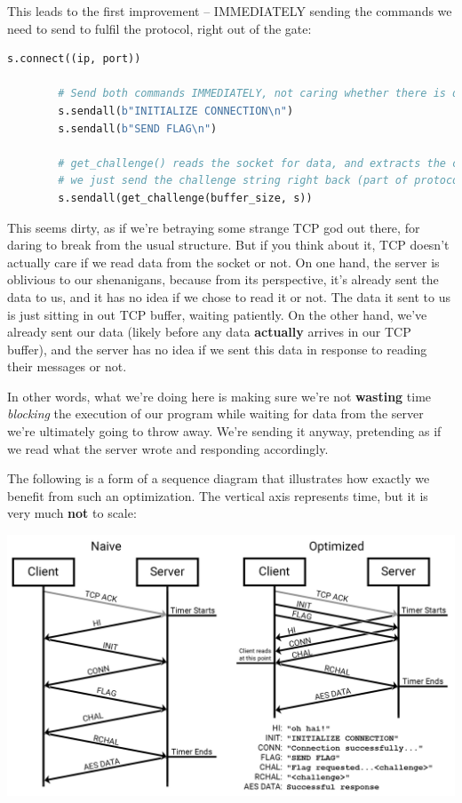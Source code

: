 \documentclass[11pt]{article}
\begin{document}
    This leads to the first improvement -- IMMEDIATELY sending the commands we need to send to fulfil the protocol, right out of the gate:

    \begin{lstlisting}[gobble=8,label={lst:first-efficiency},language=Python]
        s.connect((ip, port))

        # Send both commands IMMEDIATELY, not caring whether there is data to read or not
        s.sendall(b"INITIALIZE CONNECTION\n")
        s.sendall(b"SEND FLAG\n")

        # get_challenge() reads the socket for data, and extracts the challenge string.
        # we just send the challenge string right back (part of protocol)
        s.sendall(get_challenge(buffer_size, s))
    \end{lstlisting}

    This seems dirty, as if we're betraying some strange TCP god out there, for daring to break from the usual structure. But if you think about it, TCP doesn't actually care if we read data from the socket or not. On one hand, the server is oblivious to our shenanigans, because from its perspective, it's already sent the data to us, and it has no idea if we chose to read it or not. The data it sent to us is just sitting in out TCP buffer, waiting patiently. On the other hand, we've already sent our data (likely before any data \textbf{actually} arrives in our TCP buffer), and the server has no idea if we sent this data in response to reading their messages or not.

    In other words, what we're doing here is making sure we're not \textbf{wasting} time \textit{blocking} the execution of our program while waiting for data from the server we're ultimately going to throw away. We're sending it anyway, pretending as if we read what the server wrote and responding accordingly.

    \pagebreak

    The following is a form of a sequence diagram that illustrates how exactly we benefit from such an optimization. The vertical axis represents time, but it is very much \textbf{not} to scale:

    \noindent\includegraphics[width=\textwidth]{images/network_diagram}
\end{document}
